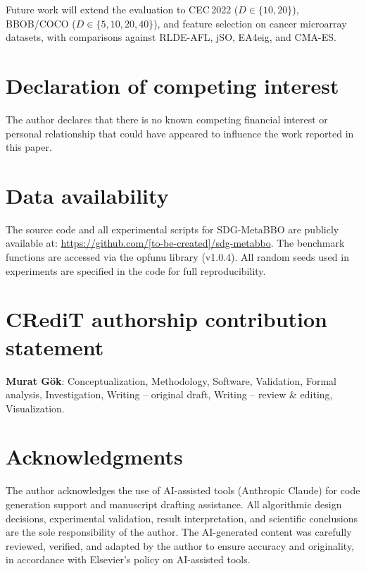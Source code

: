 \documentclass[preprint,12pt,number]{elsarticle}
\begin{document}
Future work will extend the evaluation to CEC\,2022 ($D \in \{10, 20\}$), BBOB/COCO ($D \in \{5, 10, 20, 40\}$), and feature selection on cancer microarray datasets, with comparisons against RLDE-AFL, jSO, EA4eig, and CMA-ES.


\section*{Declaration of competing interest}

The author declares that there is no known competing financial interest or personal relationship that could have appeared to influence the work reported in this paper.

\section*{Data availability}

The source code and all experimental scripts for SDG-MetaBBO \cite{SDGcode2026} are publicly available at: \url{https://github.com/[to-be-created]/sdg-metabbo}. The benchmark functions are accessed via the opfunu library (v1.0.4). All random seeds used in experiments are specified in the code for full reproducibility.

\section*{CRediT authorship contribution statement}

\textbf{Murat G\"ok}: Conceptualization, Methodology, Software, Validation, Formal analysis, Investigation, Writing -- original draft, Writing -- review \& editing, Visualization.

\section*{Acknowledgments}

The author acknowledges the use of AI-assisted tools (Anthropic Claude) for code generation support and manuscript drafting assistance. All algorithmic design decisions, experimental validation, result interpretation, and scientific conclusions are the sole responsibility of the author. The AI-generated content was carefully reviewed, verified, and adapted by the author to ensure accuracy and originality, in accordance with Elsevier's policy on AI-assisted tools.
\end{document}
